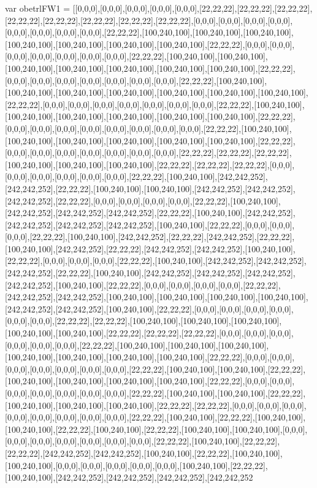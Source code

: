 var obetrlFW1 = [[0,0,0],[0,0,0],[0,0,0],[0,0,0],[0,0,0],[22,22,22],[22,22,22],[22,22,22],[22,22,22],[22,22,22],[22,22,22],[22,22,22],[22,22,22],[0,0,0],[0,0,0],[0,0,0],[0,0,0],[0,0,0],[0,0,0],[0,0,0],[0,0,0],[22,22,22],[100,240,100],[100,240,100],[100,240,100],[100,240,100],[100,240,100],[100,240,100],[100,240,100],[22,22,22],[0,0,0],[0,0,0],[0,0,0],[0,0,0],[0,0,0],[0,0,0],[0,0,0],[22,22,22],[100,240,100],[100,240,100],[100,240,100],[100,240,100],[100,240,100],[100,240,100],[100,240,100],[22,22,22],[0,0,0],[0,0,0],[0,0,0],[0,0,0],[0,0,0],[0,0,0],[0,0,0],[22,22,22],[100,240,100],[100,240,100],[100,240,100],[100,240,100],[100,240,100],[100,240,100],[100,240,100],[22,22,22],[0,0,0],[0,0,0],[0,0,0],[0,0,0],[0,0,0],[0,0,0],[0,0,0],[22,22,22],[100,240,100],[100,240,100],[100,240,100],[100,240,100],[100,240,100],[100,240,100],[22,22,22],[0,0,0],[0,0,0],[0,0,0],[0,0,0],[0,0,0],[0,0,0],[0,0,0],[0,0,0],[22,22,22],[100,240,100],[100,240,100],[100,240,100],[100,240,100],[100,240,100],[100,240,100],[22,22,22],[0,0,0],[0,0,0],[0,0,0],[0,0,0],[0,0,0],[0,0,0],[0,0,0],[22,22,22],[22,22,22],[22,22,22],[100,240,100],[100,240,100],[100,240,100],[22,22,22],[22,22,22],[22,22,22],[0,0,0],[0,0,0],[0,0,0],[0,0,0],[0,0,0],[0,0,0],[22,22,22],[100,240,100],[242,242,252],[242,242,252],[22,22,22],[100,240,100],[100,240,100],[242,242,252],[242,242,252],[242,242,252],[22,22,22],[0,0,0],[0,0,0],[0,0,0],[0,0,0],[22,22,22],[100,240,100],[242,242,252],[242,242,252],[242,242,252],[22,22,22],[100,240,100],[242,242,252],[242,242,252],[242,242,252],[242,242,252],[100,240,100],[22,22,22],[0,0,0],[0,0,0],[0,0,0],[22,22,22],[100,240,100],[242,242,252],[22,22,22],[242,242,252],[22,22,22],[100,240,100],[242,242,252],[22,22,22],[242,242,252],[242,242,252],[100,240,100],[22,22,22],[0,0,0],[0,0,0],[0,0,0],[22,22,22],[100,240,100],[242,242,252],[242,242,252],[242,242,252],[22,22,22],[100,240,100],[242,242,252],[242,242,252],[242,242,252],[242,242,252],[100,240,100],[22,22,22],[0,0,0],[0,0,0],[0,0,0],[0,0,0],[22,22,22],[242,242,252],[242,242,252],[100,240,100],[100,240,100],[100,240,100],[100,240,100],[242,242,252],[242,242,252],[100,240,100],[22,22,22],[0,0,0],[0,0,0],[0,0,0],[0,0,0],[0,0,0],[0,0,0],[22,22,22],[22,22,22],[100,240,100],[100,240,100],[100,240,100],[100,240,100],[100,240,100],[22,22,22],[22,22,22],[22,22,22],[0,0,0],[0,0,0],[0,0,0],[0,0,0],[0,0,0],[0,0,0],[22,22,22],[100,240,100],[100,240,100],[100,240,100],[100,240,100],[100,240,100],[100,240,100],[100,240,100],[22,22,22],[0,0,0],[0,0,0],[0,0,0],[0,0,0],[0,0,0],[0,0,0],[0,0,0],[22,22,22],[100,240,100],[100,240,100],[22,22,22],[100,240,100],[100,240,100],[100,240,100],[100,240,100],[22,22,22],[0,0,0],[0,0,0],[0,0,0],[0,0,0],[0,0,0],[0,0,0],[0,0,0],[22,22,22],[100,240,100],[100,240,100],[22,22,22],[100,240,100],[100,240,100],[100,240,100],[22,22,22],[22,22,22],[0,0,0],[0,0,0],[0,0,0],[0,0,0],[0,0,0],[0,0,0],[0,0,0],[0,0,0],[22,22,22],[100,240,100],[22,22,22],[100,240,100],[100,240,100],[22,22,22],[100,240,100],[22,22,22],[100,240,100],[100,240,100],[0,0,0],[0,0,0],[0,0,0],[0,0,0],[0,0,0],[0,0,0],[0,0,0],[22,22,22],[100,240,100],[22,22,22],[22,22,22],[242,242,252],[242,242,252],[100,240,100],[22,22,22],[100,240,100],[100,240,100],[0,0,0],[0,0,0],[0,0,0],[0,0,0],[0,0,0],[100,240,100],[22,22,22],[100,240,100],[242,242,252],[242,242,252],[242,242,252],[242,242,252
